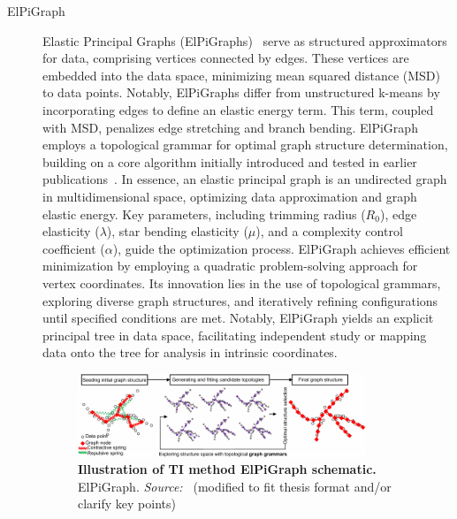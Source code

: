 \begin{description}
    \item[ElPiGraph]
    Elastic Principal Graphs (ElPiGraphs)~\citep{albergante2020ElPiGraph} serve as structured approximators for data, comprising vertices connected by edges. These vertices are embedded into the data space, minimizing mean squared distance (MSD) to data points. Notably, ElPiGraphs differ from unstructured k-means by incorporating edges to define an elastic energy term. This term, coupled with MSD, penalizes edge stretching and branch bending. ElPiGraph employs a topological grammar for optimal graph structure determination, building on a core algorithm initially introduced and tested in earlier publications~\citep{gorban2007topological}. In essence, an elastic principal graph is an undirected graph in multidimensional space, optimizing data approximation and graph elastic energy. Key parameters, including trimming radius ($R_0$), edge elasticity ($\lambda$), star bending elasticity ($\mu$), and a complexity control coefficient ($\alpha$), guide the optimization process. ElPiGraph achieves efficient minimization by employing a quadratic problem-solving approach for vertex coordinates. Its innovation lies in the use of topological grammars, exploring diverse graph structures, and iteratively refining configurations until specified conditions are met. Notably, ElPiGraph yields an explicit principal tree in data space, facilitating independent study or mapping data onto the tree for analysis in intrinsic coordinates.

     \begin{figure}[ht!]
    	\centering
    	\includegraphics[width=0.85\textwidth]{TI_Alg_ElPiGraph/fig}
    	\vspace{0.1cm}
    	\caption[Illustration of TI method ElPiGraph schematic.]{\textbf{Illustration of TI method ElPiGraph schematic.} ElPiGraph. \emph{Source:~\cite{cao2019monocle3}} (modified to fit thesis format and/or clarify key points)
    	}
    	\label{fig:TI_Alg_ElPiGraph}
    \end{figure}


\end{description}
